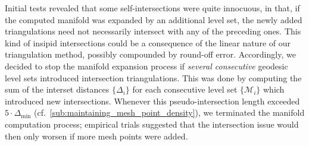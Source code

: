 

Initial tests revealed that some self-intersections were quite innocuous, in
that, if the computed manifold was expanded by an additional level set,
the newly added triangulations need not necessarily intersect with any of the
preceding ones. This kind of insipid intersections could be a consequence of
the linear nature of our triangulation method, possibly compounded by round-off
error. Accordingly, we decided to stop the manifold expansion process
if \emph{several consecutive} geodesic level sets introduced intersection
triangulations. This was done by computing the sum of the interset distances
$\{\Delta_{i}\}$ for each consecutive level set $\{\mathcal{M}_{i}\}$ which
introduced new intersections. Whenever this pseudo-intersection length
exceeded $5\cdot\Delta_{\min}$ (cf.\
\cref{sub:maintaining_mesh_point_density}),
we terminated the manifold computation process; empirical trials suggested
that the intersection issue would then only worsen if more mesh points were
added.

